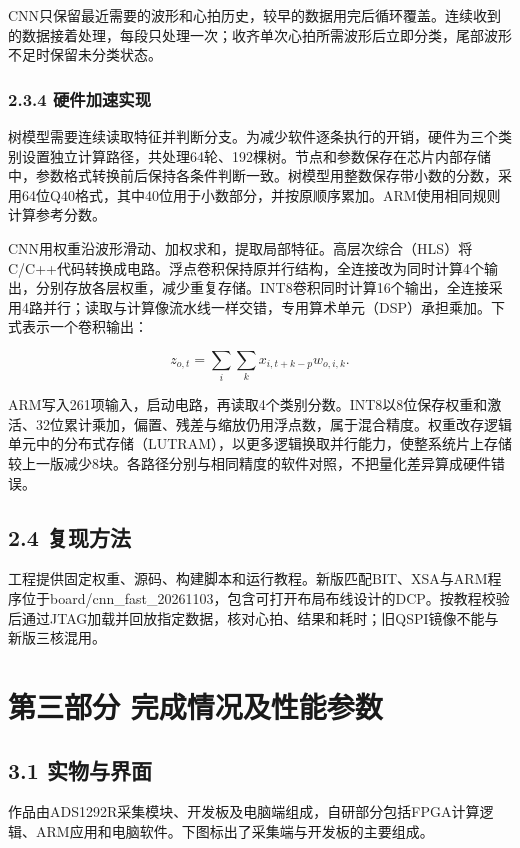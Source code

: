\documentclass[UTF8,12pt,a4paper,fontset=none]{ctexart}
\begin{document}
CNN只保留最近需要的波形和心拍历史，较早的数据用完后循环覆盖。连续收到的数据接着处理，每段只处理一次；收齐单次心拍所需波形后立即分类，尾部波形不足时保留未分类状态。

\subsubsection{2.3.4 硬件加速实现}

树模型需要连续读取特征并判断分支。为减少软件逐条执行的开销，硬件为三个类别设置独立计算路径，共处理64轮、192棵树。节点和参数保存在芯片内部存储中，参数格式转换前后保持各条件判断一致。树模型用整数保存带小数的分数，采用64位Q40格式，其中40位用于小数部分，并按原顺序累加。ARM使用相同规则计算参考分数。

CNN用权重沿波形滑动、加权求和，提取局部特征。高层次综合（HLS）将C/C++代码转换成电路。浮点卷积保持原并行结构，全连接改为同时计算4个输出，分别存放各层权重，减少重复存储。INT8卷积同时计算16个输出，全连接采用4路并行；读取与计算像流水线一样交错，专用算术单元（DSP）承担乘加。下式表示一个卷积输出：

\[z_{o,t} = \sum_i\sum_k x_{i,t+k-p}w_{o,i,k}.\]

ARM写入261项输入，启动电路，再读取4个类别分数。INT8以8位保存权重和激活、32位累计乘加，偏置、残差与缩放仍用浮点数，属于混合精度。权重改存逻辑单元中的分布式存储（LUTRAM），以更多逻辑换取并行能力，使整系统片上存储较上一版减少8块。各路径分别与相同精度的软件对照，不把量化差异算成硬件错误。

\subsection{2.4 复现方法}

工程提供固定权重、源码、构建脚本和运行教程。新版匹配BIT、XSA与ARM程序位于board/cnn\_fast\_20261103，包含可打开布局布线设计的DCP。按教程校验后通过JTAG加载并回放指定数据，核对心拍、结果和耗时；旧QSPI镜像不能与新版三核混用。

\section{第三部分 完成情况及性能参数}

\subsection{3.1 实物与界面}

作品由ADS1292R采集模块、开发板及电脑端组成，自研部分包括FPGA计算逻辑、ARM应用和电脑软件。下图标出了采集端与开发板的主要组成。
\end{document}
